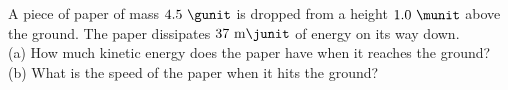 A piece of paper of mass $4.5\ \gunit$ is dropped from a height $1.0\ \munit$
above the ground. The paper dissipates $37\ \text{m}\junit$
of energy on its way down.\\
%
(a) How much kinetic energy does the paper have when it reaches the
ground?\answercheck\hwendpart
%
(b) What is the speed of the paper when it hits the ground?\answercheck
